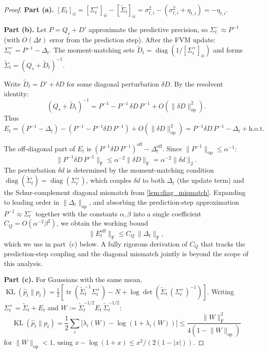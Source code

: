 \documentclass[10pt,a4paper]{amsart}
\DeclareMathOperator{\KL}{KL}
\DeclareMathOperator{\diag}{diag}
\newcommand{\fnorm}[1]{\lVert #1 \rVert_{\mathrm{F}}}
\newcommand{\norm}[1]{\lVert #1 \rVert}
\newcommand{\opnorm}[1]{\lVert #1 \rVert_{\mathrm{op}}}
\DeclareMathOperator{\tr}{tr}
\begin{document}
\begin{proof}
\textbf{Part (a).} $[E_t]_{ii} = [\Sigma_t^+]_{ii} - [\widetilde{\Sigma}_t]_{ii} = \sigma_{t,i}^2 - (\sigma_{t,i}^2 + \eta_{t,i}) = -\eta_{t,i}$.

\medskip\noindent
\textbf{Part (b).} Let $P = Q_s + D'$ approximate the predictive precision, so $\Sigma_t^- \approx P^{-1}$ (with $O(\Delta t)$ error from the prediction step). After the FVM update: $\Sigma_t^+ = P^{-1} - \Delta_t$. The moment-matching sets $\widetilde{D}_t = \diag(1/[\Sigma_t^+]_{ii})$ and forms $\widetilde{\Sigma}_t = (Q_s + \widetilde{D}_t)^{-1}$.

Write $\widetilde{D}_t = D' + \delta D$ for some diagonal perturbation $\delta D$. By the resolvent identity:
\[
(Q_s + \widetilde{D}_t)^{-1} = P^{-1} - P^{-1}\,\delta D\, P^{-1} + O(\opnorm{\delta D}^2).
\]
Thus $E_t = (P^{-1} - \Delta_t) - (P^{-1} - P^{-1}\delta D\, P^{-1}) + O(\opnorm{\delta D}^2) = P^{-1}\delta D\, P^{-1} - \Delta_t + \text{h.o.t.}$

The off-diagonal part of $E_t$ is $(P^{-1}\delta D\, P^{-1})^{\mathrm{off}} - \Delta_t^{\mathrm{off}}$. Since $\opnorm{P^{-1}} \leq \alpha^{-1}$:
\[
\fnorm{P^{-1}\delta D\, P^{-1}} \leq \alpha^{-2}\fnorm{\delta D} = \alpha^{-2}\norm{\delta d}_2.
\]
The perturbation $\delta d$ is determined by the moment-matching condition $\diag(\widetilde{\Sigma}_t) = \diag(\Sigma_t^+)$, which couples $\delta d$ to both $\Delta_t$ (the update term) and the Schur-complement diagonal mismatch from \cref{lem:diag_mismatch}. Expanding to leading order in $\opnorm{\Delta_t}$, and absorbing the prediction-step approximation $P^{-1} \approx \Sigma_t^-$ together with the constants $\alpha, \beta$ into a single coefficient $C_Q = O(\alpha^{-2}\beta^2)$, we obtain the working bound
\begin{equation}\label{eq:E_off_bound}
\fnorm{E_t^{\mathrm{off}}} \leq C_Q\,\fnorm{\Delta_t},
\end{equation}
which we use in part~(c) below. A fully rigorous derivation of $C_Q$ that tracks the prediction-step coupling and the diagonal mismatch jointly is beyond the scope of this analysis.

\medskip\noindent
\textbf{Part (c).} For Gaussians with the same mean, $\KL(\hat{p}_t \| p_t) = \frac{1}{2}[\tr(\widetilde{\Sigma}_t^{-1}\Sigma_t^+) - N + \log\det(\widetilde{\Sigma}_t\,(\Sigma_t^+)^{-1})]$. Writing $\Sigma_t^+ = \widetilde{\Sigma}_t + E_t$ and $W := \widetilde{\Sigma}_t^{-1/2}E_t\,\widetilde{\Sigma}_t^{-1/2}$:
\begin{equation}\label{eq:kl_perturb}
\KL(\hat{p}_t\|p_t) = \frac{1}{2}\sum_i\bigl[\lambda_i(W) - \log(1 + \lambda_i(W))\bigr] \leq \frac{\fnorm{W}^2}{4(1 - \opnorm{W})}
\end{equation}
for $\opnorm{W} < 1$, using $x - \log(1+x) \leq x^2/(2(1-|x|))$.


\end{proof}
\end{document}
